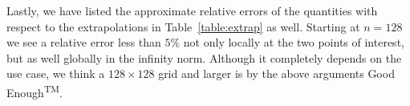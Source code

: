 Lastly, we have listed the approximate relative errors of the quantities with respect to the extrapolations in Table~\ref{table:extrap} as well. Starting at $n = 128$ we see a relative error less than $5\%$ not only locally at the two points of interest, but as well globally in the infinity norm. Although it completely depends on the use case, we think a $128 \times 128$ grid and larger is by the above arguments Good Enough\textsuperscript{TM}.